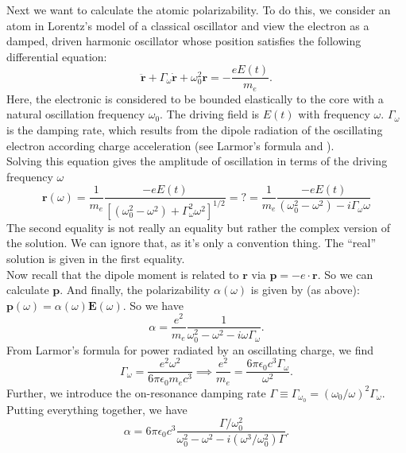 \documentclass{book}
\theoremstyle{definition}
\newcommand{\al}{\alpha}
\newcommand{\f}[2]{\frac{#1}{#2}}
\begin{document}
\begin{framed}
	Next we want to calculate the atomic polarizability. To do this, we consider an atom in Lorentz's model of a classical oscillator and view the electron as a damped, driven harmonic oscillator whose position satisfies the following differential equation:
	\begin{equation*}
	\ddot{\mathbf{r}} + \Gamma_\omega \dot{\mathbf{r}} + \omega_0^2 \mathbf{r} = -\f{eE(t)}{m_e}.
	\end{equation*}
	Here, the electronic is considered to be bounded elastically to the core with a natural oscillation frequency $\omega_0$. The driving field is $E(t)$ with frequency $\omega$. $\Gamma_\omega$ is the damping rate, which results from the dipole radiation of the oscillating electron according charge acceleration (see Larmor's formula and \cite{jackson1999classical}). \\
	
	Solving this equation gives the amplitude of oscillation in terms of the driving frequency $\omega$
	\begin{equation*}
	\mathbf{r}(\omega) = \f{1}{m_e}\f{-eE(t)}{[(\omega_0^2 - \omega^2) + \Gamma_\omega^2 \omega^2]^{1/2}} =?= \f{1}{m_e} \f{-eE(t)}{(\omega_0^2 - \omega^2) - i\Gamma_\omega \omega}
	\end{equation*}
	 The second equality is not really an equality but rather the complex version of the solution. We can ignore that, as it's only a convention thing. The ``real'' solution is given in the first equality. \\
	 
	 Now recall that the dipole moment is related to $\mathbf{r}$ via $\mathbf{p} = -e\cdot \mathbf{r}$. So we can calculate $\mathbf{p}$. And finally, the polarizability $\al(\omega)$ is given by (as above): $\mathbf{p}(\omega) = \al(\omega) \mathbf{E}(\omega)$. So we have
	 \begin{equation*}
	 \al = \f{e^2}{m_e} \f{1}{\omega_0^2 - \omega^2 - i\omega \Gamma_\omega}.
	 \end{equation*}
	 From Larmor's formula for power radiated by an oscillating charge, we find 
	 \begin{equation*}
	 \Gamma_\omega = \f{e^2 \omega^2}{6\pi \epsilon_0 m_e c^3} \implies \f{e^2}{m_e} = \f{6\pi \epsilon_0 c^3 \Gamma_\omega}{\omega^2}.
	 \end{equation*}
	 Further, we introduce the on-resonance damping rate $\Gamma \equiv \Gamma_{\omega_0} =  (\omega_0/\omega)^2 \Gamma_\omega$. Putting everything together, we have
	 \begin{equation*}
	 \al = 6\pi \epsilon_0 c^3 \f{\Gamma/\omega_0^2}{\omega_0^2 - \omega^2 - i(\omega^3 / \omega_0^2) \Gamma}.
	 \end{equation*}
	 

\end{framed}
\end{document}
